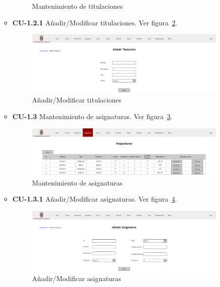 \begin{itemize}
\begin{itemize}
\begin{figure}[!h]
		\caption{Mantenimiento de titulaciones}\label{F-CU1.2}
		\end{figure}
		\FloatBarrier
		\item \textbf{CU-1.2.1} Añadir/Modificar titulaciones. Ver figura~\ref{F-CU1.2.1}.
		\begin{figure}[!h]
		\centering
		\includegraphics[width=\textwidth]{../img/Anexos/Vistas/add_titulacion.png}
		\caption{Añadir/Modificar titulaciones}\label{F-CU1.2.1}
		\end{figure}
		\FloatBarrier
\newpage
		\item \textbf{CU-1.3} Mantenimiento de asignaturas. Ver figura~\ref{F-CU1.3}.
		\begin{figure}[!h]
		\centering
		\includegraphics[width=\textwidth]{../img/Anexos/Vistas/asignaturas.png}
		\caption{Mantenimiento de asignaturas}\label{F-CU1.3}
		\end{figure}
		\FloatBarrier
		\item \textbf{CU-1.3.1} Añadir/Modificar asignaturas. Ver figura~\ref{F-CU1.3.1}.
		\begin{figure}[!h]
		\centering
		\includegraphics[width=\textwidth]{../img/Anexos/Vistas/add_asignatura.png}
		\caption{Añadir/Modificar asignaturas}\label{F-CU1.3.1}
		\end{figure}
		\FloatBarrier
	\end{itemize}
	

\end{itemize}
